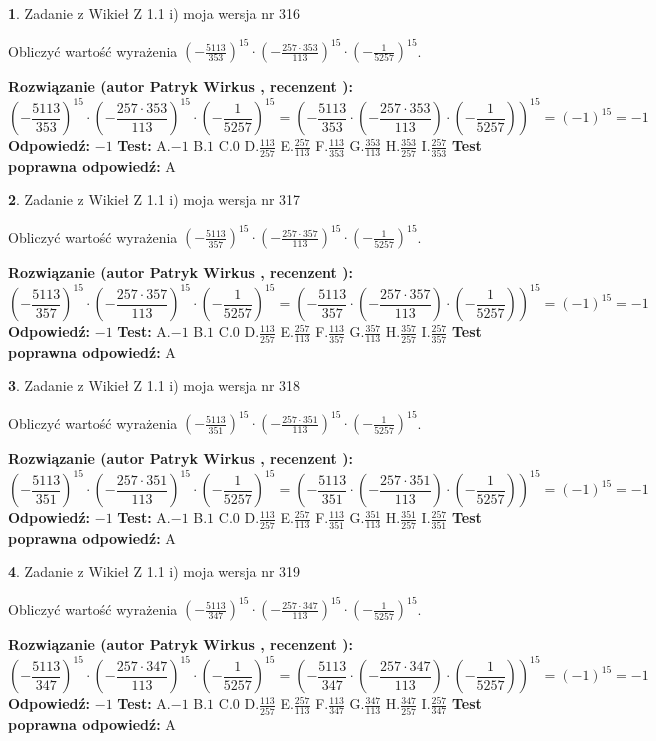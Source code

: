 \documentclass[12pt, a4paper]{article}
\theoremstyle{definition} %
\newtheorem{zad}{}
\newcommand{\zadStart}[1]{\begin{zad}#1\newline}
\newcommand{\zadStop}{\end{zad}}
\newcommand{\rozwStart}[2]{\noindent \textbf{Rozwiązanie (autor #1 , recenzent #2): }\newline}
\newcommand{\rozwStop}{\newline}
\newcommand{\odpStart}{\noindent \textbf{Odpowiedź:}\newline}
\newcommand{\odpStop}{\newline}
\newcommand{\testStart}{\noindent \textbf{Test:}\newline}
\newcommand{\testStop}{\newline}
\newcommand{\kluczStart}{\noindent \textbf{Test poprawna odpowiedź:}\newline}
\newcommand{\kluczStop}{\newline}
\begin{document}
\zadStart{Zadanie z Wikieł Z 1.1 i) moja wersja nr 316}

Obliczyć wartość wyrażenia $(-\frac{5113}{353})^{15} \cdot (-\frac{257 \cdot 353}{113})^{15} \cdot (-\frac{1}{5257})^{15}$.
\zadStop
\rozwStart{Patryk Wirkus}{}
$$(-\frac{5113}{353})^{15} \cdot (-\frac{257 \cdot 353}{113})^{15} \cdot (-\frac{1}{5257})^{15} = (-\frac{5113}{353} \cdot (-\frac{257 \cdot 353}{113}) \cdot (-\frac{1}{5257}))^{15} = (-1)^{15} = -1$$
\rozwStop
\odpStart
$-1$
\odpStop
\testStart
A.$-1$ B.$1$ C.$0$ D.$\frac{113}{257}$ E.$\frac{257}{113}$
F.$\frac{113}{353}$ G.$\frac{353}{113}$
H.$\frac{353}{257}$
I.$\frac{257}{353}$
\testStop
\kluczStart
A
\kluczStop



\zadStart{Zadanie z Wikieł Z 1.1 i) moja wersja nr 317}

Obliczyć wartość wyrażenia $(-\frac{5113}{357})^{15} \cdot (-\frac{257 \cdot 357}{113})^{15} \cdot (-\frac{1}{5257})^{15}$.
\zadStop
\rozwStart{Patryk Wirkus}{}
$$(-\frac{5113}{357})^{15} \cdot (-\frac{257 \cdot 357}{113})^{15} \cdot (-\frac{1}{5257})^{15} = (-\frac{5113}{357} \cdot (-\frac{257 \cdot 357}{113}) \cdot (-\frac{1}{5257}))^{15} = (-1)^{15} = -1$$
\rozwStop
\odpStart
$-1$
\odpStop
\testStart
A.$-1$ B.$1$ C.$0$ D.$\frac{113}{257}$ E.$\frac{257}{113}$
F.$\frac{113}{357}$ G.$\frac{357}{113}$
H.$\frac{357}{257}$
I.$\frac{257}{357}$
\testStop
\kluczStart
A
\kluczStop



\zadStart{Zadanie z Wikieł Z 1.1 i) moja wersja nr 318}

Obliczyć wartość wyrażenia $(-\frac{5113}{351})^{15} \cdot (-\frac{257 \cdot 351}{113})^{15} \cdot (-\frac{1}{5257})^{15}$.
\zadStop
\rozwStart{Patryk Wirkus}{}
$$(-\frac{5113}{351})^{15} \cdot (-\frac{257 \cdot 351}{113})^{15} \cdot (-\frac{1}{5257})^{15} = (-\frac{5113}{351} \cdot (-\frac{257 \cdot 351}{113}) \cdot (-\frac{1}{5257}))^{15} = (-1)^{15} = -1$$
\rozwStop
\odpStart
$-1$
\odpStop
\testStart
A.$-1$ B.$1$ C.$0$ D.$\frac{113}{257}$ E.$\frac{257}{113}$
F.$\frac{113}{351}$ G.$\frac{351}{113}$
H.$\frac{351}{257}$
I.$\frac{257}{351}$
\testStop
\kluczStart
A
\kluczStop



\zadStart{Zadanie z Wikieł Z 1.1 i) moja wersja nr 319}

Obliczyć wartość wyrażenia $(-\frac{5113}{347})^{15} \cdot (-\frac{257 \cdot 347}{113})^{15} \cdot (-\frac{1}{5257})^{15}$.
\zadStop
\rozwStart{Patryk Wirkus}{}
$$(-\frac{5113}{347})^{15} \cdot (-\frac{257 \cdot 347}{113})^{15} \cdot (-\frac{1}{5257})^{15} = (-\frac{5113}{347} \cdot (-\frac{257 \cdot 347}{113}) \cdot (-\frac{1}{5257}))^{15} = (-1)^{15} = -1$$
\rozwStop
\odpStart
$-1$
\odpStop
\testStart
A.$-1$ B.$1$ C.$0$ D.$\frac{113}{257}$ E.$\frac{257}{113}$
F.$\frac{113}{347}$ G.$\frac{347}{113}$
H.$\frac{347}{257}$
I.$\frac{257}{347}$
\testStop
\kluczStart
A
\kluczStop
\end{document}
